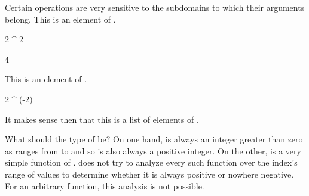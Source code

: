 \begin{xtc}
\begin{xtccomment}
Certain operations are very sensitive to the subdomains to which their
arguments belong.
This is an element of .
\end{xtccomment}
\begin{spadsrc}
2 ^ 2
\end{spadsrc}
\begin{TeXOutput}
\begin{fricasmath}{7}
4%
\end{fricasmath}
\end{TeXOutput}
\end{xtc}
\begin{xtc}
\begin{xtccomment}
This is an element of .
\end{xtccomment}
\begin{spadsrc}
2 ^ (-2)
\end{spadsrc}
\begin{TeXOutput}
\begin{fricasmath}{8}
%
\end{fricasmath}
\end{TeXOutput}
\end{xtc}
\begin{xtc}
\begin{xtccomment}
It makes sense then that this
is a list of elements of .
\end{xtccomment}
\begin{spadsrc}
[10^i for i in 2..5]
\end{spadsrc}
\begin{TeXOutput}
\begin{fricasmath}{9}
%
\end{fricasmath}
\end{TeXOutput}
\end{xtc}
What should the type of \spad{[10^(i-1) for i in 2..5]} be?
On one hand,  is always an integer greater than zero
as  ranges from  to  and so 
is also always a positive integer.
On the other,  is a very simple function of .
\Language{} does not try to analyze every such function over the
index's range of values to determine whether it is always positive
or nowhere negative.
For an arbitrary \Language{} function, this analysis is not possible.

